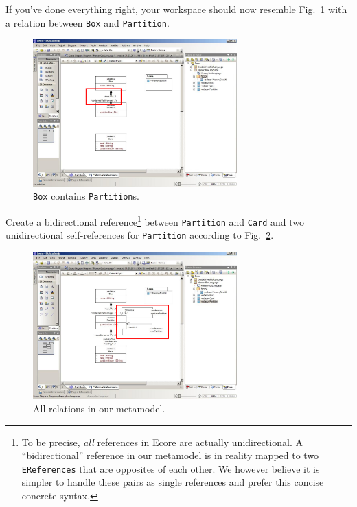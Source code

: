 \clearpage

If you've done everything right, your workspace should now resemble
Fig.~\ref{fig:ereference_completed} with a relation between \texttt{Box} and
\texttt{Partition}.

\begin{figure}[htbp]
	\centering
  \includegraphics[width=0.7\textwidth]{pics/memBox28.png}
	\caption{\texttt{Box} contains \texttt{Partition}s.}
	\label{fig:ereference_completed}
\end{figure}

Create a bidirectional reference\footnote{To be precise, \emph{all} references
in Ecore are actually unidirectional.  A ``bidirectional'' reference in our
metamodel is in reality mapped to two \texttt{EReferences} that are opposites of
each other.  
We however believe it is simpler to handle these pairs as single references and
prefer this concise concrete syntax.} between \texttt{Partition} and \texttt{Card}
and two unidirectional self-references for \texttt{Partition} according to
Fig.~\ref{fig:ereferences_all}.
 
\begin{figure}[htbp]
	\centering
  \includegraphics[width=0.7\textwidth]{pics/memBox34.png}
	\caption{All relations in our metamodel.}
	\label{fig:ereferences_all}
\end{figure}

